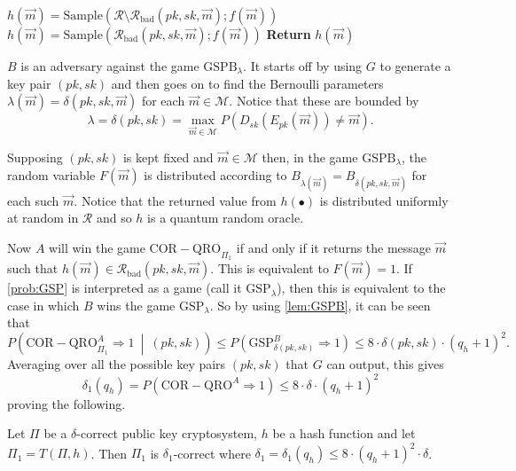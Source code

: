 \begin{center}
\begin{minipage}[ht!]{0.6\textwidth}
	\begin{algorithm}[H]
		\centering
		\caption{$h\left(\vec{m}\right)$}
		\label{alg:hFromHHKp28}
		\begin{algorithmic}
				\State $h\left(\vec{m}\right) = \mathrm{Sample}\left(\mathcal{R} \setminus \mathcal{R}_{\mathrm{bad}}\left(pk,sk, \vec{m}\right); f\left(\vec{m}\right)\right)$
			\Else
				\State $h\left(\vec{m}\right) = \mathrm{Sample}\left(\mathcal{R}_{\mathrm{bad}}\left(pk,sk, \vec{m}\right); f\left(\vec{m}\right)\right)$
			\EndIf
			\State \textbf{Return} $h\left(\vec{m}\right)$
		\end{algorithmic}
	\end{algorithm}
\end{minipage}
\end{center}
%
$B$ is an adversary against the game $\mathrm{GSPB}_{\lambda}$. It starts off by using $G$ to generate a key pair $\left(pk,sk\right)$ and then goes on to find the Bernoulli parameters $\lambda\left(\vec{m}\right) = \delta\left(pk, sk, \vec{m}\right)$ for each $\vec{m} \in \mathcal{M}$. Notice that these are bounded by
\[
	\lambda = \delta\left(pk,sk\right) = \max\limits_{\vec{m} \in \mathcal{M}} P\left( D_{sk}\left(  E_{pk}\left( \vec{m}\right)\right) \neq \vec{m} \right) .
\]

Supposing $\left(pk,sk\right)$ is kept fixed and $\vec{m} \in \mathcal{M}$ then, in the game $\mathrm{GSPB}_{\lambda}$, the random variable $F\left(\vec{m}\right)$ is distributed according to $B_{\lambda\left(\vec{m}\right)} = B_{\delta\left(pk,sk,\vec{m}\right)}$ for each such $\vec{m}$. Notice that the returned value from $h\left(\bullet\right)$ is distributed uniformly at random in $\mathcal{R}$ and so $h$ is a quantum random oracle.

Now $A$ will win the game $\mathrm{COR-QRO}_{\Pi_1}$ if and only if it returns the message $\vec{m}$ such that $h\left(\vec{m}\right) \in \mathcal{R}_{\mathrm{bad}}\left(pk,sk,\vec{m}\right)$. This is equivalent to $F\left(\vec{m}\right) = 1$. If \cref{prob:GSP} is interpreted as a game (call it \emph{$\mathrm{GSP}_{\lambda}$}), then this is equivalent to the case in which $B$ wins the game $\mathrm{GSP}_{\lambda}$. So by using \cref{lem:GSPB}, it can be seen that
\[
		P\left( \mathrm{COR-QRO}_{\Pi_1}^A \Rightarrow 1 \ \middle\vert \ \left(pk,sk\right) \right) \leq P\left( \mathrm{GSP}_{\delta\left(pk,sk\right)}^B \Rightarrow 1 \right) \leq 8 \cdot \delta\left(pk, sk\right) \cdot \left( q_h + 1\right) ^2 .
\]
Averaging over all the possible key pairs $\left(pk,sk\right)$ that $G$ can output, this gives
\[
	\delta _1 \left( q_h \right) = P\left( \mathrm{COR-QRO}^A \Rightarrow 1 \right) \leq 8 \cdot \delta \cdot \left( q_h + 1\right) ^2
\]
proving the following.
\begin{lem}
\label{lem:TCorrInQROM}
	Let $\Pi$ be a $\delta$-correct public key cryptosystem, $h$ be a hash function and let $\Pi_1 = T\left( \Pi , h \right) $. Then $\Pi_1$ is $\delta_1$-correct where $\delta_1 = \delta _1 \left( q_h \right) \leq 8 \cdot \left( q_h + 1 \right) ^2 \cdot \delta$.
\end{lem}

